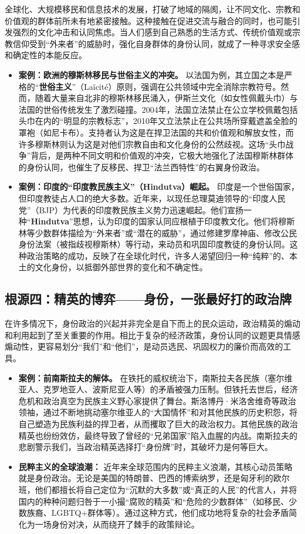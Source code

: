 全球化、大规模移民和信息技术的发展，打破了地域的隔阂，让不同文化、宗教和价值观的群体前所未有地紧密接触。这种接触在促进交流与融合的同时，也可能引发强烈的文化冲击和认同焦虑。当人们感到自己熟悉的生活方式、传统价值观或宗教信仰受到“外来者”的威胁时，强化自身群体的身份认同，就成了一种寻求安全感和确定性的本能反应。
\begin{itemize}
    \item \textbf{案例：欧洲的穆斯林移民与世俗主义的冲突。} 以法国为例，其立国之本是严格的“\textbf{世俗主义}”（Laïcité）原则，强调在公共领域中完全消除宗教符号。然而，随着大量来自北非的穆斯林移民涌入，伊斯兰文化（如女性佩戴头巾）与法国的世俗传统发生了激烈碰撞。2004年，法国立法禁止在公立学校佩戴包括头巾在内的“明显的宗教标志”，2010年又立法禁止在公共场所穿戴遮盖全脸的罩袍（如尼卡布）。支持者认为这是在捍卫法国的共和价值观和解放女性，而许多穆斯林则认为这是对他们宗教自由和文化身份的公然歧视。这场“头巾战争”背后，是两种不同文明和价值观的冲突，它极大地强化了法国穆斯林群体的身份认同，也催生了反移民、捍卫“法兰西特性”的右翼身份政治。

    \item \textbf{案例：印度的“印度教民族主义”（Hindutva）崛起。} 印度是一个世俗国家，但印度教徒占人口的绝大多数。近年来，以现任总理莫迪领导的“印度人民党”（BJP）为代表的印度教民族主义势力迅速崛起。他们宣扬一种“\textbf{Hindutva}”思想，认为印度的国家认同应根植于印度教文化。他们将穆斯林等少数群体描绘为“外来者”或“潜在的威胁”，通过修建罗摩神庙、修改公民身份法案（被指歧视穆斯林）等行动，来动员和巩固印度教徒的身份认同。这种政治策略的成功，反映了在全球化时代，许多人渴望回归一种“纯粹”的、本土的文化身份，以抵御外部世界的变化和不确定性。
\end{itemize}

\subsection{根源四：精英的博弈——身份，一张最好打的政治牌}

在许多情况下，身份政治的兴起并非完全是自下而上的民众运动，政治精英的煽动和利用起到了至关重要的作用。相比于复杂的经济政策，身份认同的议题更具情感煽动性，更容易划分“我们”和“他们”，是动员选民、巩固权力的廉价而高效的工具。
\begin{itemize}
    \item \textbf{案例：前南斯拉夫的解体。} 在铁托的威权统治下，南斯拉夫各民族（塞尔维亚人、克罗地亚人、波斯尼亚人等）的矛盾被强力压制。但铁托去世后，经济危机和政治真空为民族主义野心家提供了舞台。斯洛博丹·米洛舍维奇等政治领袖，通过不断地挑动塞尔维亚人的“大国情怀”和对其他民族的历史积怨，将自己塑造为民族利益的捍卫者，从而攫取了巨大的政治权力。其他民族的政治精英也纷纷效仿，最终导致了曾经的“兄弟国家”陷入血腥的内战。南斯拉夫的悲剧警示我们，当政治精英选择打“身份牌”时，其破坏力是何等巨大。

    \item \textbf{民粹主义的全球浪潮：} 近年来全球范围内的民粹主义浪潮，其核心动员策略就是身份政治。无论是美国的特朗普、巴西的博索纳罗，还是匈牙利的欧尔班，他们都擅长将自己定位为“沉默的大多数”或“真正的人民”的代言人，并将国内的种种问题归咎于一小撮“腐败的精英”和“危险的少数群体”（如移民、少数族裔、LGBTQ+群体等）。通过这种方式，他们成功地将复杂的社会矛盾简化为一场身份对决，从而绕开了棘手的政策辩论。
\end{itemize}

